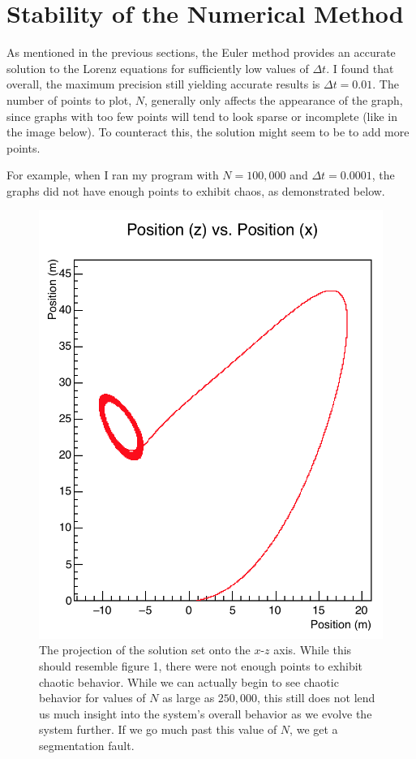 \documentclass[12pt]{amsart}
\begin{document}
\newpage
\section{Stability of the Numerical Method}
As mentioned in the previous sections, the Euler method provides an accurate solution to the Lorenz equations for sufficiently low values of 
$\Delta t$. I found that overall, the maximum precision still yielding accurate results is $\Delta t = 0.01$. The number of points to plot, $N$,
generally only affects the appearance of the graph, since graphs with too few points will tend to look sparse or incomplete (like in the image 
below). To counteract this, the solution might seem to be to add more points.

For example, when I ran my program with $N = 100,000$ and $\Delta t = 0.0001$, the graphs did not have enough points to exhibit chaos, as
demonstrated below. 
\begin{figure}[h]
	\begin{center}
		\includegraphics[scale=0.63]{fig-4.png}
	\end{center}
	\caption{The projection of the solution set onto the $x$-$z$ axis. While this should resemble figure 1, there were not enough points to
	exhibit chaotic behavior. While we can actually begin to see chaotic behavior for values of $N$ as large as $250,000$, this still does not
	lend us much insight into the system's overall behavior as we evolve the system further. If we go much past this value of $N$, we get a
	segmentation fault. }
\end{figure}
\end{document}
